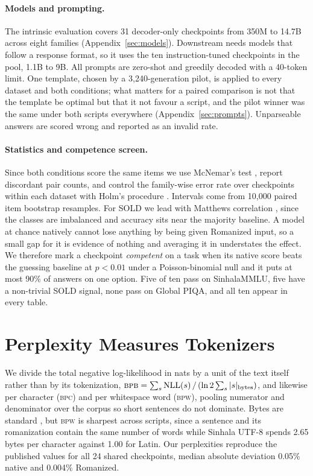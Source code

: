 \documentclass[11pt]{article}
\newcommand{\bpb}{\textsc{bpb}}
\newcommand{\bpw}{\textsc{bpw}}
\newcommand{\bpc}{\textsc{bpc}}
\begin{document}
\paragraph{Models and prompting.}
The intrinsic evaluation covers 31 decoder-only checkpoints from 350M to 14.7B across
eight families (Appendix~\ref{sec:models}). Downstream needs models that follow a
response format, so it uses the ten instruction-tuned checkpoints in the pool, 1.1B to
9B. All prompts are zero-shot and greedily decoded with a 40-token limit. One template,
chosen by a 3{,}240-generation pilot, is applied to every dataset and both conditions;
what matters for a paired comparison is not that the template be optimal but that it not
favour a script, and the pilot winner was the same under both scripts everywhere
(Appendix~\ref{sec:prompts}). Unparseable answers are scored wrong and reported as an
invalid rate.

\paragraph{Statistics and competence screen.}
Since both conditions score the same items we use McNemar's test
\citep{mcnemar-1947, dror-etal-2018-hitchhikers}, report discordant pair counts, and
control the family-wise error rate over checkpoints within each dataset with Holm's
procedure \citep{holm-1979}. Intervals come from 10{,}000 paired item bootstrap resamples.
For SOLD we lead with Matthews correlation \citep{matthews-1975, chicco-jurman-2020},
since the classes are imbalanced and accuracy sits near the majority baseline. A model at
chance natively cannot
lose anything by being given Romanized input, so a small gap for it is evidence of
nothing and averaging it in understates the effect. We therefore mark a checkpoint
\emph{competent} on a task when its native score beats the guessing baseline at
$p < 0.01$ under a Poisson-binomial null and it puts at most 90\% of answers on one
option. Five of ten pass on SinhalaMMLU, five have a non-trivial SOLD signal, none
pass on Global PIQA, and all ten appear in every table.

\section{Perplexity Measures Tokenizers}
\label{sec:intrinsic}

We divide the total negative log-likelihood in nats by a unit of the text itself
rather than by its tokenization,
$\bpb = \sum_s \mathrm{NLL}(s) \,/\, (\ln 2 \sum_s |s|_{\text{bytes}})$, and likewise
per character (\bpc) and per whitespace word (\bpw), pooling numerator and denominator
over the corpus so short sentences do not dominate. Bytes are standard
\citep{gao-etal-2020-pile}, but \bpw{} is sharpest across scripts, since a sentence and its
romanization contain the same number of words while Sinhala UTF-8 spends 2.65 bytes per
character against 1.00 for Latin. Our perplexities reproduce the published values for all
24 shared checkpoints, median absolute deviation 0.05\% native and 0.004\% Romanized.
\end{document}
